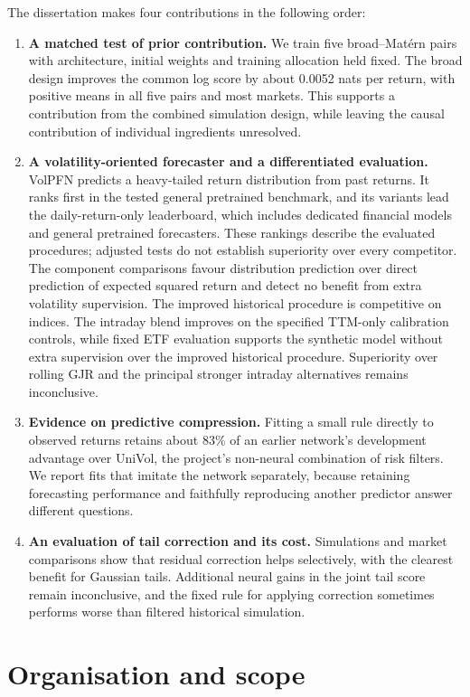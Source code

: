 The dissertation makes four contributions in the following order:
\begin{enumerate}
\item \textbf{A matched test of prior contribution.} We train five broad--Mat\'ern pairs with architecture, initial weights and training allocation held fixed. The broad design improves the common log score by about 0.0052 nats per return, with positive means in all five pairs and most markets. This supports a contribution from the combined simulation design, while leaving the causal contribution of individual ingredients unresolved.
\item \textbf{A volatility-oriented forecaster and a differentiated evaluation.} VolPFN predicts a heavy-tailed return distribution from past returns. It ranks first in the tested general pretrained benchmark, and its variants lead the daily-return-only leaderboard, which includes dedicated financial models and general pretrained forecasters. These rankings describe the evaluated procedures; adjusted tests do not establish superiority over every competitor. The component comparisons favour distribution prediction over direct prediction of expected squared return and detect no benefit from extra volatility supervision. The improved historical procedure is competitive on indices. The intraday blend improves on the specified TTM-only calibration controls, while fixed ETF evaluation supports the synthetic model without extra supervision over the improved historical procedure. Superiority over rolling GJR and the principal stronger intraday alternatives remains inconclusive.
\item \textbf{Evidence on predictive compression.} Fitting a small rule directly to observed returns retains about 83\% of an earlier network's development advantage over UniVol, the project's non-neural combination of risk filters. We report fits that imitate the network separately, because retaining forecasting performance and faithfully reproducing another predictor answer different questions.
\item \textbf{An evaluation of tail correction and its cost.} Simulations and market comparisons show that residual correction helps selectively, with the clearest benefit for Gaussian tails. Additional neural gains in the joint tail score remain inconclusive, and the fixed rule for applying correction sometimes performs worse than filtered historical simulation.
\end{enumerate}

\section{Organisation and scope}

